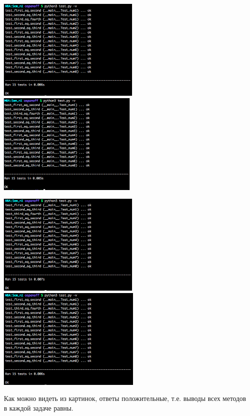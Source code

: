 \documentclass[12pt, a4paper]{article}
\begin{document}
			\begin{center}
				\includegraphics[height=5cm]{test/7.png}
				\includegraphics[height=5cm]{test/8.png}
			\end{center}

			\begin{center}
				\includegraphics[height=5cm]{test/9.png}
				\includegraphics[height=5cm]{test/10.png}
			\end{center}

			Как можно видеть из картинок, ответы положительные, т.е. выводы всех методов в каждой задаче равны.
\end{document}
